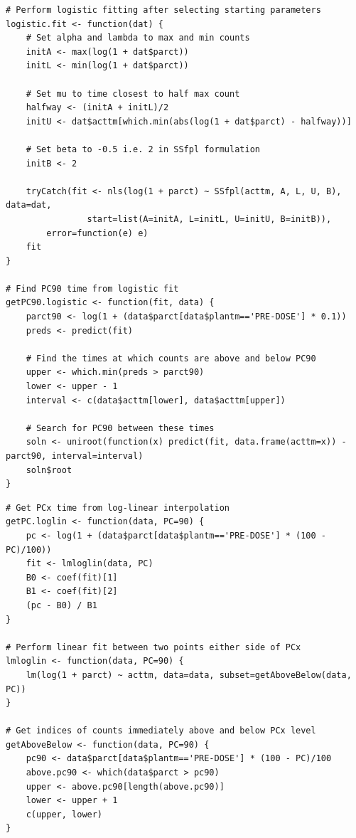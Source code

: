 \begin{lstlisting}[float=h,caption=Functions to find PC90 by logistic regression,label=R:logistics]
# Perform logistic fitting after selecting starting parameters
logistic.fit <- function(dat) {
	# Set alpha and lambda to max and min counts
	initA <- max(log(1 + dat$parct))
	initL <- min(log(1 + dat$parct))

	# Set mu to time closest to half max count
	halfway <- (initA + initL)/2
	initU <- dat$acttm[which.min(abs(log(1 + dat$parct) - halfway))]

	# Set beta to -0.5 i.e. 2 in SSfpl formulation
	initB <- 2
	
	tryCatch(fit <- nls(log(1 + parct) ~ SSfpl(acttm, A, L, U, B), data=dat,
				start=list(A=initA, L=initL, U=initU, B=initB)),
		error=function(e) e)
	fit
}

# Find PC90 time from logistic fit
getPC90.logistic <- function(fit, data) {
	parct90 <- log(1 + (data$parct[data$plantm=='PRE-DOSE'] * 0.1))
	preds <- predict(fit)

	# Find the times at which counts are above and below PC90
	upper <- which.min(preds > parct90)
	lower <- upper - 1
	interval <- c(data$acttm[lower], data$acttm[upper])

	# Search for PC90 between these times
	soln <- uniroot(function(x) predict(fit, data.frame(acttm=x)) - parct90, interval=interval)
	soln$root
}
\end{lstlisting}

\begin{lstlisting}[float=h,caption=Functions to find PC90 by log-linear interpolation,label=R:loglinear]
# Get PCx time from log-linear interpolation
getPC.loglin <- function(data, PC=90) {
	pc <- log(1 + (data$parct[data$plantm=='PRE-DOSE'] * (100 - PC)/100))
	fit <- lmloglin(data, PC)
	B0 <- coef(fit)[1]
	B1 <- coef(fit)[2]
	(pc - B0) / B1
}

# Perform linear fit between two points either side of PCx
lmloglin <- function(data, PC=90) {
	lm(log(1 + parct) ~ acttm, data=data, subset=getAboveBelow(data, PC))
}

# Get indices of counts immediately above and below PCx level
getAboveBelow <- function(data, PC=90) {
	pc90 <- data$parct[data$plantm=='PRE-DOSE'] * (100 - PC)/100
	above.pc90 <- which(data$parct > pc90)
	upper <- above.pc90[length(above.pc90)]
	lower <- upper + 1
	c(upper, lower)
}
\end{lstlisting}

\clearpage
